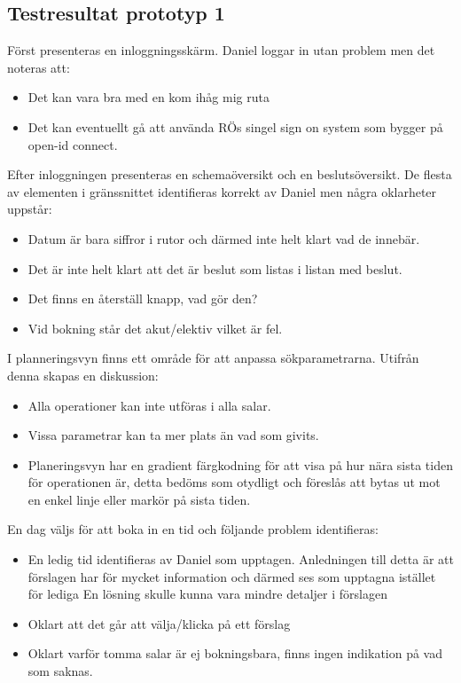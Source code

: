 \documentclass[a4paper,10pt, twoside]{article}
\begin{document}
\subsection{Testresultat prototyp 1}
Först presenteras en inloggningsskärm. Daniel loggar in utan problem men det noteras att:
\begin{itemize}
  \item Det kan vara bra med en kom ihåg mig ruta
  \item Det kan eventuellt gå att använda RÖs singel sign on system som bygger på open-id connect.
\end{itemize}
Efter inloggningen presenteras en schemaöversikt och en beslutsöversikt. De flesta av elementen i gränssnittet identifieras korrekt av Daniel men några oklarheter uppstår:
\begin{itemize}
\item Datum är bara siffror i rutor och därmed inte helt klart vad de innebär.
\item Det är inte helt klart att det är beslut som listas i listan med beslut.
\item Det finns en återställ knapp, vad gör den?
\item Vid bokning står det akut/elektiv vilket är fel.
\end{itemize}
I planneringsvyn finns ett område för att anpassa sökparametrarna. Utifrån denna skapas en diskussion:
\begin{itemize}
\item Alla operationer kan inte utföras i alla salar.
\item Vissa parametrar kan ta mer plats än vad som givits.
\item Planeringsvyn har en gradient färgkodning för att visa på hur nära sista tiden för operationen är, detta bedöms som otydligt och föreslås att bytas ut mot en enkel linje eller markör på sista tiden.
\end{itemize}

En dag väljs för att boka in en tid och följande problem identifieras: \\
\begin{itemize}
\item En ledig tid identifieras av Daniel som upptagen. Anledningen till detta är att förslagen har för mycket information och därmed ses som upptagna istället för lediga
En lösning skulle kunna vara mindre detaljer i förslagen
\item Oklart att det går att välja/klicka på ett förslag
\item Oklart varför tomma salar är ej bokningsbara, finns ingen indikation på vad som saknas.
\end{itemize}
\end{document}
